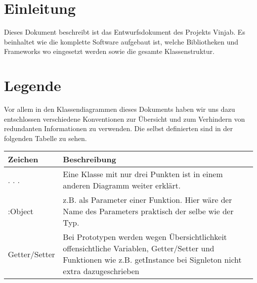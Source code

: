 \documentclass[entwurf.tex]{subfiles}
\begin{document}
\section{Einleitung}
Dieses Dokument beschreibt ist das Entwurfsdokument des Projekts Vinjab. Es beinhaltet wie die komplette Software aufgebaut ist, welche Bibliotheken und Frameworks wo eingesetzt werden sowie die gesamte Klassenstruktur.

\section{Legende}
Vor allem in den Klassendiagrammen dieses Dokuments haben wir uns dazu entschlossen verschiedene Konventionen zur Übersicht und zum Verhindern von redundanten Informationen zu verwenden. Die selbst definierten sind in der folgenden Tabelle zu sehen.

\begin{tabularx}{\textwidth}{ l|X }
	Zeichen	& Beschreibung\\
	\hline
	. . .	& Eine Klasse mit nur drei Punkten ist in einem anderen Diagramm weiter erklärt.\\
	:Object	& z.B. als Parameter einer Funktion. Hier wäre der Name des Parameters praktisch der selbe wie der Typ.\\
	Getter/Setter & Bei Prototypen werden wegen Übersichtlichkeit offensichtliche Variablen, Getter/Setter und Funktionen wie z.B. getInstance bei Signleton nicht extra dazugeschrieben
\end{tabularx}
\end{document}
